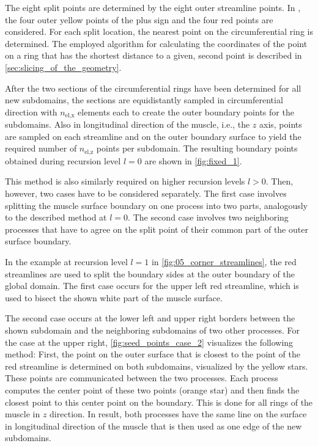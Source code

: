 The eight split points are determined by the eight outer streamline points. In , the four outer yellow points of the plus sign and the four red points are considered. For each split location, the nearest point on the circumferential ring is determined. The employed algorithm for calculating the coordinates of the point on a ring that has the shortest distance to a given, second point is described in \cref{sec:slicing_of_the_geometry}.

After the two sections of the circumferential rings have been determined for all new subdomains, the sections are equidistantly sampled in circumferential direction with $n_\text{el,x}$ elements each to create the outer boundary points for the subdomains. 
Also in longitudinal direction of the muscle, i.e., the $z$ axis, points are sampled on each streamline and on the outer boundary surface to yield the required number of $n_\text{el,z}$ points per subdomain. The resulting boundary points obtained during recursion level $l=0$ are shown in \cref{fig:fixed_1}.

This method is also similarly required on higher recursion levels $l>0$. 
Then, however, two cases have to be considered separately. The first case involves splitting the muscle surface boundary on one process into two parts, analogously to the described method at $l=0$. The second case involves two neighboring processes that have to agree on the split point of their common part of the outer surface boundary.

In the example at recursion level $l=1$ in \cref{fig:05_corner_streamlines}, the red streamlines are used to split the boundary sides at the outer boundary of the global domain. 
The first case occurs for the upper left red streamline, which is used to bisect the shown white part of the muscle surface. 

The second case occurs at the lower left and upper right borders between the shown subdomain and the neighboring subdomains of two other processes. For the case at the upper right, \cref{fig:seed_points_case_2} visualizes the following method: First, the point on the outer surface that is closest to the point of the red streamline is determined on both subdomains, visualized by the yellow stars. These points are communicated between the two processes. Each process computes the center point of these two points (orange star) and then finds the closest point to this center point on the boundary. This is done for all rings of the muscle in $z$ direction. In result, both processes have the same line on the surface in longitudinal direction of the muscle that is then used as one edge of the new subdomains.

